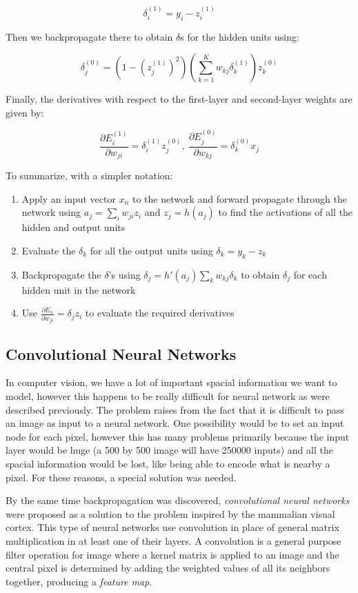 \documentclass[11pt]{article}
\begin{document}
\[\delta _i^{(1)} = y_i - z_i^{(1)}\]

Then we backpropagate there to obtain \(\delta\)s for the hidden units
using:

\[\delta_j^{(0)} = (1-(z_j^{(1)})^2)(\sum_{k=1}^K w_{kj}\delta_k^{(1)})z_k^{(0)}\]

Finally, the derivatives with respect to the first-layer and
second-layer weights are given by:

\[\frac{\partial E_i^{(1)}}{\partial w_{ji}}=\delta_i^{(1)}z_j^{(0)},\ \frac{\partial E_j^{(0)}}{\partial w_{kj}}=\delta _k^{(0)}x_j\]

To summarize, with a simpler notation:

\begin{enumerate}
\def\labelenumi{\arabic{enumi}.}
\tightlist
\item
  Apply an input vector \(x_n\) to the network and forward propagate
  through the network using \(a_j=\sum_iw_{ji}z_i\) and \(z_j=h(a_j)\)
  to find the activations of all the hidden and output units
\item
  Evaluate the \(\delta_k\) for all the output units using
  \(\delta_k=y_k-z_k\)
\item
  Backpropagate the \(\delta\)'s using
  \(\delta_j=h'(a_j)\sum_k w_{kj}\delta_k\) to obtain \(\delta_j\) for
  each hidden unit in the network
\item
  Use \(\frac{\partial E_n}{\partial w_{ji}}=\delta_jz_i\) to evaluate
  the required derivatives
\end{enumerate}

\subsection{Convolutional Neural
Networks}\label{convolutional-neural-networks}

In computer vision, we have a lot of important spacial information we
want to model, however this happens to be really difficult for neural
network as were described previously. The problem raises from the fact
that it is difficult to pass an image as input to a neural network. One
possibility would be to set an input node for each pixel, however this
has many problems primarily because the input layer would be huge (a 500
by 500 image will have 250000 inputs) and all the spacial information
would be lost, like being able to encode what is nearby a pixel. For
these reasons, a special solution was needed.

By the same time backpropagation was discovered, \emph{convolutional
neural networks} were proposed as a solution to the problem inspired by
the mammalian visual cortex. This type of neural networks use
convolution in place of general matrix multiplication in at least one of
their layers. A convolution is a general purpose filter operation for
image where a kernel matrix is applied to an image and the central pixel
is determined by adding the weighted values of all its neighbors
together, producing a \emph{feature map}.
\end{document}
